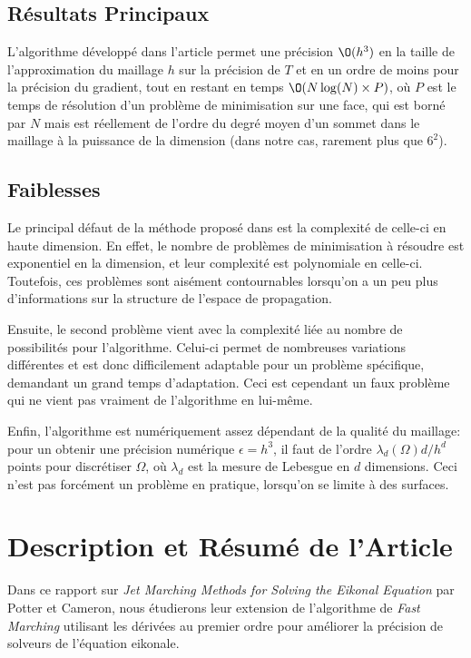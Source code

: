 \documentclass[math, info]{mpb-cours}
\begin{document}
\subsection{Résultats Principaux}
L'algorithme développé dans l'article permet une précision $\O(h^{3})$ en la taille de l'approximation
du maillage $h$ sur la précision de $T$ et en un ordre de moins pour la précision du gradient, tout en
restant en temps $\O(N\log(N)\times P)$, où $P$ est le temps de résolution d'un problème de minimisation
sur une face, qui est borné par $N$ mais est réellement de l'ordre du degré moyen d'un sommet dans le
maillage à la puissance de la dimension (dans notre cas, rarement plus que $6^{2}$).

\subsection{Faiblesses}
Le principal défaut de la méthode proposé dans \cite{potter2021jetmarchingmethodssolving} est la complexité
de celle-ci en haute dimension.
En effet, le nombre de problèmes de minimisation à résoudre est exponentiel en la dimension, et leur
complexité est polynomiale en celle-ci.
Toutefois, ces problèmes sont aisément contournables lorsqu'on a un peu plus d'informations sur la structure
de l'espace de propagation.

Ensuite, le second problème vient avec la complexité liée au nombre de possibilités pour l'algorithme.
Celui-ci permet de nombreuses variations différentes et est donc difficilement adaptable pour un
problème spécifique, demandant un grand temps d'adaptation.
Ceci est cependant un faux problème qui ne vient pas vraiment de l'algorithme en lui-même.

Enfin, l'algorithme est numériquement assez dépendant de la qualité du maillage: pour un obtenir une
précision numérique $\epsilon = h^{3}$, il faut de l'ordre $\lambda_{d}(\Omega) d/ h^{d}$ points pour
discrétiser $\Omega$, où $\lambda_{d}$ est la mesure de Lebesgue en $d$ dimensions.
Ceci n'est pas forcément un problème en pratique, lorsqu'on se limite à des surfaces.

\newpage

\section{Description et Résumé de l'Article}

Dans ce rapport sur \textit{Jet Marching Methods for Solving the Eikonal Equation} par Potter et Cameron,
nous étudierons leur extension de l'algorithme de \textit{Fast Marching} utilisant les dérivées au
premier ordre pour améliorer la précision de solveurs de l'équation eikonale.
\end{document}
